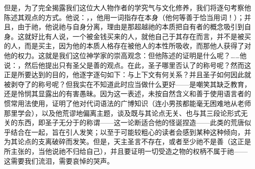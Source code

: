 但是，为了完全揭露我们这位大人物作者的学究气与文化修养，我们将逐句考察他陈述其观点的方式。他说：，，他用一词指存在本身（他何等善于恰当用词！）；并且，由于祂，他说祂与自身分离，理由是那超越祂的本质把自有者的概念吸引到自身。这就好比有人说，一个被金钱买来的人，就他自己于其存在而言，并不是被买的人，而是买主，因为他的本质人格存在被他人的本性所吸收，而那他人获得了对他的权力。这就是我们这位神学家的崇高观念：但他陈述的证明是什么呢？……他说：，然后他提出只有圣父是善的观点。在此，圣子哪里否认了的称号呢？然而这正是所要达到的目的，他逐字逐句如下：与上下文有何关系？并且圣子如何因此就被剥夺了的称号呢？但我实在不知道此时应当做什么更好——是嘲笑其缺乏教育，还是怜悯其显露出的有害愚昧。因为这一表述，未按自然含义和善于使用语言者的惯常用法使用，证明了他对代词语法的广博知识（连小男孩都能毫无困难地从老师那里学会），以及他荒谬地偏离主题，谈及既与其论点无关、也与其三段论形式无关的东西，即圣子无分于的称谓——这一论断适合他的怪诞捏造——此类的荒唐似乎结合在一起，旨在引人发笑；以至于可能较粗心的读者会感到某种这种倾向，并为其论点的支离破碎而发笑。但是，天主圣言不存在，或者至少祂不是善（这正是所主张的，当他说祂不归给自己），并且要证明一切受造之物的权柄不属于祂——这需要我们流泪，需要哀悼的哭声。\par

